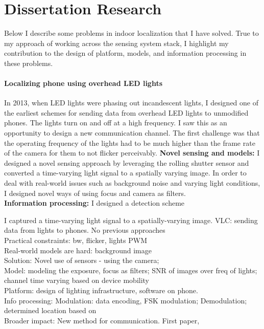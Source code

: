 \documentclass[10pt]{article}
\begin{document}

\section{Dissertation Research}
Below I describe some problems in indoor localization that I have solved. True to my approach of working across the sensing system stack, I highlight my contribution to the design of platform, models, and information processing in these problems.\\

\paragraph{Localizing phone using overhead LED lights}
In 2013, when LED lights were phasing out incandescent lights, I designed one of the earliest schemes for sending data from overhead LED lights to unmodified phones. The lights turn on and off at a high frequency. I saw this as an opportunity to design a new communication channel. The first challenge was that the operating frequency of the lights had to be much higher than the frame rate of the camera for them to not flicker perceivably. %
\textbf{Novel sensing and models: }
 I designed a novel sensing approach by leveraging the rolling shutter sensor and converted a time-varying light signal to a spatially varying image. In order to deal with real-world issues such as background noise and varying light conditions, I designed novel ways of using focus and camera as filters.\\
 \textbf{Information processing: } I designed a detection scheme 


I captured a time-varying light signal to a spatially-varying image.  
VLC: sending data from lights to phones. No previous approaches\\
Practical constraints: bw, flicker, lights PWM\\
Real-world models are hard: background image\\
Solution:
Novel use of sensors - using the camera;\\
Model: modeling the exposure, focus as filters; SNR of images over freq of lights; channel time varying based on device mobility\\
Platform: design of lighting infrastructure, software on phone.\\
Info processing: Modulation: data encoding, FSK modulation; Demodulation; determined location based on \\
Broader impact:
New method for communication.
First paper, 
\end{document}
